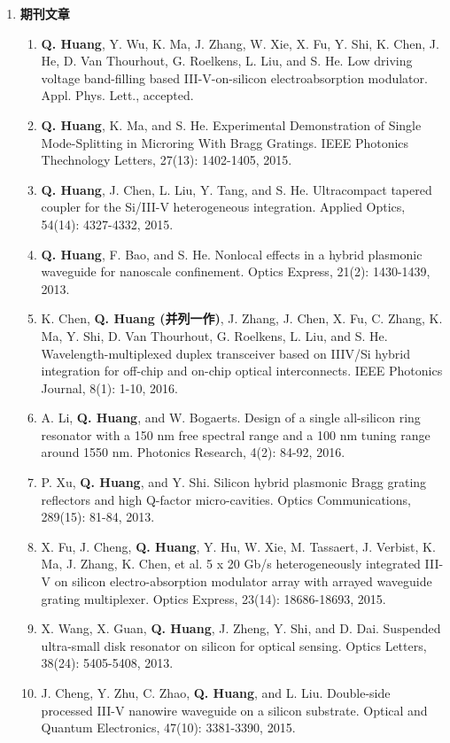 \begin{publications}
\begin{enumerate}[]
	\item \textbf{期刊文章}
	\begin{enumerate}[1.]
		\item \textbf{Q. Huang}, Y. Wu, K. Ma, J. Zhang, W. Xie, X. Fu, Y. Shi, K. Chen, J. He, D. Van Thourhout, G. Roelkens, L. Liu, and S. He. Low driving voltage band-filling based III-V-on-silicon electroabsorption modulator. Appl. Phys. Lett., accepted.
		\item \textbf{Q. Huang}, K. Ma, and S. He. Experimental Demonstration of Single Mode-Splitting in Microring With Bragg Gratings. IEEE Photonics Thechnology Letters, 27(13): 1402-1405, 2015.
		\item \textbf{Q. Huang}, J. Chen, L. Liu, Y. Tang, and S. He. Ultracompact tapered coupler for the Si/III-V heterogeneous integration. Applied Optics, 54(14): 4327-4332, 2015.
		\item \textbf{Q. Huang}, F. Bao, and S. He. Nonlocal effects in a hybrid plasmonic waveguide for nanoscale confinement. Optics Express, 21(2): 1430-1439, 2013.
		\item K. Chen, \textbf{Q. Huang (并列一作)}, J. Zhang, J. Chen, X. Fu, C. Zhang, K. Ma, Y. Shi, D. Van Thourhout, G. Roelkens, L. Liu, and S. He. Wavelength-multiplexed duplex transceiver based on IIIV/Si hybrid integration for off-chip 
		and on-chip optical interconnects. IEEE Photonics Journal, 8(1): 1-10, 2016. 		
		\item A. Li, \textbf{Q. Huang}, and W. Bogaerts. Design of a single all-silicon ring resonator with a 150 nm free spectral range and a 100 nm tuning range around 1550 nm. Photonics Research, 4(2): 84-92, 2016.
		\item P. Xu, \textbf{Q. Huang}, and Y. Shi. Silicon hybrid plasmonic Bragg grating reflectors and high Q-factor micro-cavities. Optics Communications, 289(15): 81-84, 2013.		
		\item X. Fu, J. Cheng, \textbf{Q. Huang}, Y. Hu, W. Xie, M. Tassaert, J. Verbist, K. Ma, J. Zhang, K. Chen, et al. 5 x 20 Gb/s heterogeneously integrated III-V on silicon electro-absorption modulator array with arrayed waveguide grating multiplexer. Optics Express, 23(14): 18686-18693, 2015.
		\item X. Wang, X. Guan,\textbf{ Q. Huang}, J. Zheng, Y. Shi, and D. Dai. Suspended ultra-small disk resonator on silicon for optical sensing. Optics Letters, 38(24): 5405-5408, 2013.
		\item J. Cheng, Y. Zhu, C. Zhao,\textbf{ Q. Huang}, and L. Liu. Double-side processed III-V nanowire waveguide on a silicon substrate. Optical and Quantum Electronics, 47(10): 3381-3390, 2015.

\end{enumerate}
\end{enumerate}
\end{publications}

